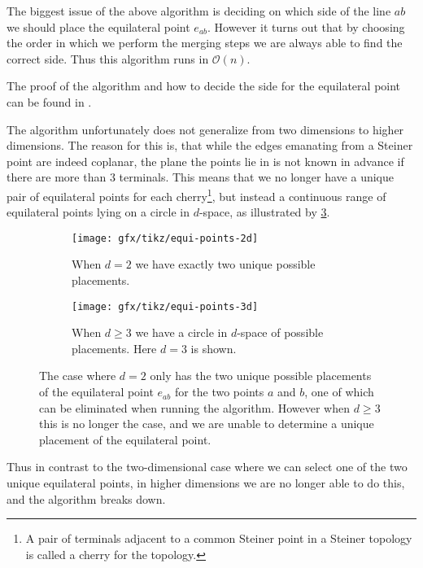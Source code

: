 The biggest issue of the above algorithm is deciding on which side of the line
$ab$ we should place the equilateral point $e_{ab}$. However it turns out that
by choosing the order in which we perform the merging steps we are always able
to find the correct side. Thus this algorithm runs in $\mathcal{O}(n)$.


The proof of the algorithm and how to decide the side for the equilateral point
can be found in \textcite[ch.~1]{brazil2015}.

The algorithm unfortunately does not generalize from two dimensions to higher
dimensions. The reason for this is, that while the edges emanating from a
Steiner point are indeed coplanar, the plane the points lie in is not known in
advance if there are more than $3$ terminals. This means that we no longer have
a unique pair of equilateral points for each cherry\footnote{A pair of terminals
  adjacent to a common Steiner point in a Steiner topology is called a cherry
  for the topology.}, but instead a continuous range of equilateral points lying
on a circle in $d$-space, as illustrated by \cref{fig:equi-points}.
%
\begin{figure}[htbp]
  \centering
  \begin{subfigure}[t]{0.4\textwidth}
    \texttt{[image: gfx/tikz/equi-points-2d]}
    \caption{When $d = 2$ we have exactly two unique possible
      placements.\label{fig:equi-points-2d}}
  \end{subfigure}\hspace{1em}%
  \begin{subfigure}[t]{0.4\textwidth}
    \texttt{[image: gfx/tikz/equi-points-3d]}
    \caption{When $d \ge 3$ we have a circle in $d$-space of possible
      placements. Here $d = 3$ is shown.\label{fig:equi-points-3d}}
  \end{subfigure}
  \caption[Equilateral points in 2D and $d$-space]{The case where $d = 2$ only
    has the two unique possible placements of the equilateral point $e_{ab}$ for the
    two points $a$ and $b$, one of which can be eliminated when running the
    algorithm. However when $d \ge 3$ this is no longer the case, and we are
    unable to determine a unique placement of the equilateral
    point.\label{fig:equi-points}}
\end{figure}
%
Thus in contrast to the two-dimensional case where we can select one of the two
unique equilateral points, in higher dimensions we are no longer able to do
this, and the algorithm breaks down.

